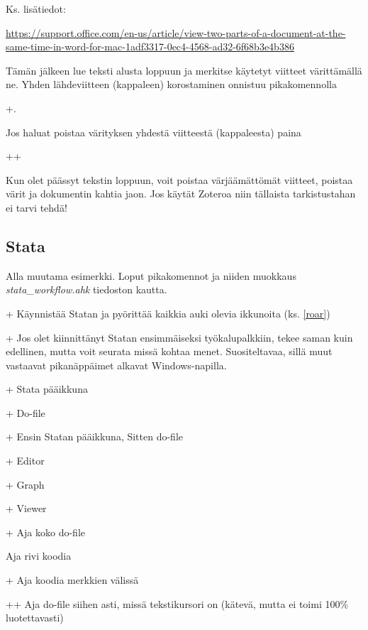 \documentclass[a4paper,12pt]{scrartcl}
\begin{document}

Ks. lisätiedot:

\url{https://support.office.com/en-us/article/view-two-parts-of-a-document-at-the-same-time-in-word-for-mac-1adf3317-0ec4-4568-ad32-6f68b3e4b386}

Tämän jälkeen lue teksti alusta loppuun ja merkitse käytetyt viitteet värittämällä ne. Yhden lähdeviitteen (kappaleen) korostaminen onnistuu pikakomennolla

+\keys{-}. 

Jos haluat poistaa värityksen yhdestä viitteestä (kappaleesta) paina

++\keys{-}

Kun olet päässyt tekstin loppuun, voit poistaa värjäämättömät viitteet, poistaa värit ja dokumentin kahtia jaon. Jos käytät Zoteroa niin tällaista tarkistustahan ei tarvi tehdä!

\subsection{Stata}

Alla muutama esimerkki. Loput pikakomennot ja niiden muokkaus \emph{stata\_workflow.ahk} tiedoston kautta.

\medskip

+ Käynnistää Statan ja pyörittää kaikkia auki olevia ikkunoita (ks. \ref{roar})

+ Jos olet kiinnittänyt Statan ensimmäiseksi työkalupalkkiin, tekee saman kuin edellinen, mutta voit seurata missä kohtaa menet. Suositeltavaa, sillä muut vastaavat pikanäppäimet alkavat Windows-napilla.

+ Stata pääikkuna

+\keys{\shift} Do-file

+\keys{\textgreater} Ensin Statan pääikkuna, Sitten do-file

+ Editor

+ Graph

+ Viewer

\medskip

\keys{\ctrl}+ Aja koko do-file

\keys{\ctrl + \return} Aja rivi koodia

+\keys{\return} Aja koodia merkkien \keys{\{} \keys{\}} välissä

++ Aja do-file siihen asti, missä tekstikursori on (kätevä, mutta ei toimi 100\% luotettavasti)


\end{document}
